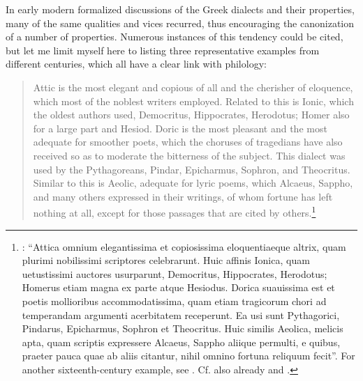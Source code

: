 In early modern formalized discussions of the Greek dialects and their properties, many of the same qualities and vices recurred, thus encouraging the canonization of a number of properties. Numerous instances of this tendency could be cited, but let me limit myself here to listing three representative examples from different centuries, which all have a clear link with philology:

\begin{quote}
Attic is the most elegant and copious of all and the cherisher of eloquence, which most of the noblest writers employed. Related to this is Ionic, which the oldest authors used, Democritus, Hippocrates, Herodotus; Homer also for a large part and Hesiod. Doric is the most pleasant and the most adequate for smoother poets, which the choruses of tragedians have also received so as to moderate the bitterness of the subject. This dialect was used by the Pythagoreans, Pindar, Epicharmus, Sophron, and Theocritus. Similar to this is Aeolic, adequate for lyric poems, which Alcaeus, Sappho, and many others expressed in their writings, of whom fortune has left nothing at all, except for those passages that are cited by others.\footnote{\citet[a.3\textsc{\textsuperscript{v}}–a.4\textsc{\textsuperscript{r}}]{Canini1555}: “Attica omnium elegantissima et copiosissima eloquentiaeque altrix, quam plurimi nobilissimi scriptores celebrarunt. Huic affinis Ionica, quam uetustissimi auctores usurparunt, Democritus, Hippocrates, Herodotus; Homerus etiam magna ex parte atque Hesiodus. Dorica suauissima est et poetis mollioribus accommodatissima, quam etiam tragicorum chori ad temperandam argumenti acerbitatem receperunt. Ea usi sunt Pythagorici, Pindarus, Epicharmus, Sophron et Theocritus. Huic similis Aeolica, melicis apta, quam scriptis expressere Alcaeus, Sappho aliique permulti, e quibus, praeter pauca quae ab aliis citantur, nihil omnino fortuna reliquum fecit”. For another sixteenth-century example, see \citet[138\textsc{\textsuperscript{v}}–139\textsc{\textsuperscript{r}}]{Vuidius1569}. Cf. also already \citet[12\textsc{\textsuperscript{v}}]{Lopad1536} and \citet[\textsc{a.6}\textsc{\textsuperscript{v}}\textsc{–a.7}\textsc{\textsuperscript{r}}]{Gessner1543}.}
\end{quote}

